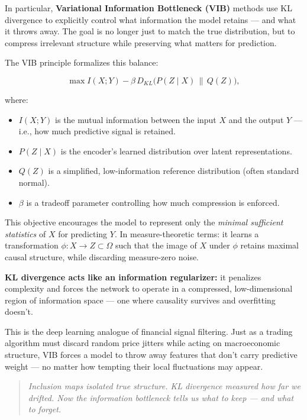 In particular, \textbf{Variational Information Bottleneck (VIB)} methods use KL divergence to explicitly control what information the model retains — and what it throws away. The goal is no longer just to match the true distribution, but to compress irrelevant structure while preserving what matters for prediction.

The VIB principle formalizes this balance:

\[
\max I(X; Y) - \beta \, D_{KL}\big(P(Z \mid X) \,\|\, Q(Z)\big),
\]

where:
\begin{itemize}
    \item \( I(X; Y) \) is the mutual information between the input \( X \) and the output \( Y \) — i.e., how much predictive signal is retained.
    \item \( P(Z \mid X) \) is the encoder’s learned distribution over latent representations.
    \item \( Q(Z) \) is a simplified, low-information reference distribution (often standard normal).
    \item \( \beta \) is a tradeoff parameter controlling how much compression is enforced.
\end{itemize}

This objective encourages the model to represent only the \textit{minimal sufficient statistics} of \( X \) for predicting \( Y \). In measure-theoretic terms: it learns a transformation \( \phi: X \rightarrow Z \subset \Omega \) such that the image of \( X \) under \( \phi \) retains maximal causal structure, while discarding measure-zero noise.

\textbf{KL divergence acts like an information regularizer:} it penalizes complexity and forces the network to operate in a compressed, low-dimensional region of information space — one where causality survives and overfitting doesn’t.

\vspace{0.5em}
\noindent
This is the deep learning analogue of financial signal filtering. Just as a trading algorithm must discard random price jitters while acting on macroeconomic structure, VIB forces a model to throw away features that don’t carry predictive weight — no matter how tempting their local fluctuations may appear.

\begin{quote}
\textit{Inclusion maps isolated true structure. KL divergence measured how far we drifted. Now the information bottleneck tells us what to keep — and what to forget.}
\end{quote}





